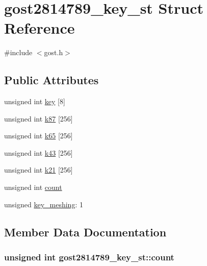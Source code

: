 \hypertarget{structgost2814789__key__st}{}\section{gost2814789\+\_\+key\+\_\+st Struct Reference}
\label{structgost2814789__key__st}


{\ttfamily \#include $<$gost.\+h$>$}

\subsection*{Public Attributes}
\begin{DoxyCompactItemize}
\item 
unsigned int \hyperlink{structgost2814789__key__st_a29b725f1181ddc478020fbae4ba11cc0}{key} \mbox{[}8\mbox{]}
\item 
unsigned int \hyperlink{structgost2814789__key__st_a7986d1ee06eb7b61bd8bdb9e86986756}{k87} \mbox{[}256\mbox{]}
\item 
unsigned int \hyperlink{structgost2814789__key__st_af47e258c28795f13ef3d594db5057cb1}{k65} \mbox{[}256\mbox{]}
\item 
unsigned int \hyperlink{structgost2814789__key__st_aa146f5b00531b9a9d1d0ea96050ea6ed}{k43} \mbox{[}256\mbox{]}
\item 
unsigned int \hyperlink{structgost2814789__key__st_a65faed36934a6141dc0d0a78b1ae37dc}{k21} \mbox{[}256\mbox{]}
\item 
unsigned int \hyperlink{structgost2814789__key__st_a78f8d262ccfe99c2432334d459c2a445}{count}
\item 
unsigned \hyperlink{structgost2814789__key__st_a50c93063f2aa8a02401aada39c206398}{key\+\_\+meshing}\+: 1
\end{DoxyCompactItemize}


\subsection{Member Data Documentation}
\subsubsection[{\texorpdfstring{count}{count}}]{\setlength{\rightskip}{0pt plus 5cm}unsigned int gost2814789\+\_\+key\+\_\+st\+::count}\hypertarget{structgost2814789__key__st_a78f8d262ccfe99c2432334d459c2a445}{}\label{structgost2814789__key__st_a78f8d262ccfe99c2432334d459c2a445}
